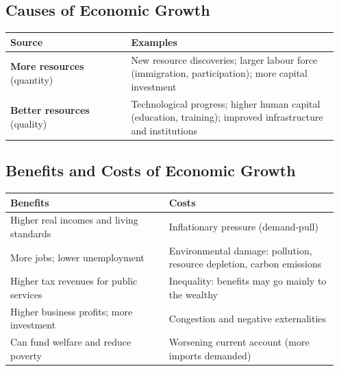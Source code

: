 \documentclass[11pt, a4paper, twoside]{book}
\begin{document}
\subsection{Causes of Economic Growth}

\begin{tcolorbox}[enhanced,colback=LightBlue,colframe=MidBlue!70,arc=0pt,boxrule=0.8pt]
\begin{tabular}{@{}>{\RaggedRight\arraybackslash}p{0.35\linewidth}>{\RaggedRight\arraybackslash}p{0.60\linewidth}@{}}
\textbf{\color{NavyPrimary}Source} & \textbf{\color{NavyPrimary}Examples} \\
\midrule
\textbf{More resources} (quantity) & New resource discoveries; larger labour force (immigration, participation); more capital investment \\
\textbf{Better resources} (quality) & Technological progress; higher human capital (education, training); improved infrastructure and institutions \\
\end{tabular}
\end{tcolorbox}

\subsection{Benefits and Costs of Economic Growth}

\begin{tcolorbox}[enhanced,colback=LightBlue,colframe=MidBlue!70,arc=0pt,boxrule=0.8pt]
\begin{tabular}{@{}>{\RaggedRight\arraybackslash}p{0.46\linewidth}>{\RaggedRight\arraybackslash}p{0.49\linewidth}@{}}
\textbf{\color{NavyPrimary}Benefits} & \textbf{\color{NavyPrimary}Costs} \\
\midrule
Higher real incomes and living standards & Inflationary pressure (demand-pull) \\
More jobs; lower unemployment & Environmental damage: pollution, resource depletion, carbon emissions \\
Higher tax revenues for public services & Inequality: benefits may go mainly to the wealthy \\
Higher business profits; more investment & Congestion and negative externalities \\
Can fund welfare and reduce poverty & Worsening current account (more imports demanded) \\
\end{tabular}
\end{tcolorbox}
\end{document}
